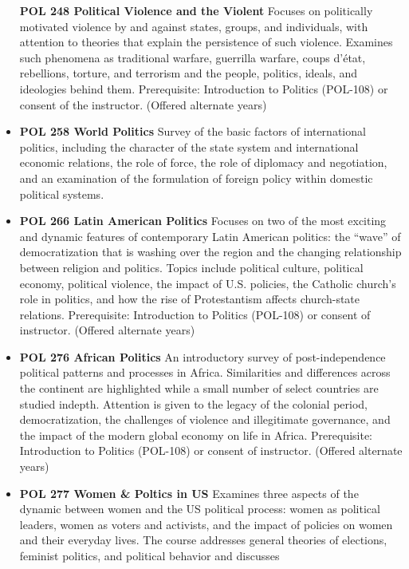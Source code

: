 \documentclass[
  letterpaper,
]{scrbook}
\begin{document}
\begin{itemize}
  \textbf{POL 248 Political Violence and the Violent} Focuses on
  politically motivated violence by and against states, groups, and
  individuals, with attention to theories that explain the persistence
  of such violence. Examines such phenomena as traditional warfare,
  guerrilla warfare, coups d'état, rebellions, torture, and terrorism
  and the people, politics, ideals, and ideologies behind them.
  Prerequisite: Introduction to Politics (POL-108) or consent of the
  instructor. (Offered alternate years)\\
\item
  \textbf{POL 258 World Politics} Survey of the basic factors of
  international politics, including the character of the state system
  and international economic relations, the role of force, the role of
  diplomacy and negotiation, and an examination of the formulation of
  foreign policy within domestic political systems.\\
\item
  \textbf{POL 266 Latin American Politics} Focuses on two of the most
  exciting and dynamic features of contemporary Latin American politics:
  the ``wave'' of democratization that is washing over the region and
  the changing relationship between religion and politics. Topics
  include political culture, political economy, political violence, the
  impact of U.S. policies, the Catholic church's role in politics, and
  how the rise of Protestantism affects church-state relations.
  Prerequisite: Introduction to Politics (POL-108) or consent of
  instructor. (Offered alternate years)
\item
  \textbf{POL 276 African Politics} An introductory survey of
  post-independence political patterns and processes in Africa.
  Similarities and differences across the continent are highlighted
  while a small number of select countries are studied indepth.
  Attention is given to the legacy of the colonial period,
  democratization, the challenges of violence and illegitimate
  governance, and the impact of the modern global economy on life in
  Africa. Prerequisite: Introduction to Politics (POL-108) or consent of
  instructor. (Offered alternate years)\\
\item
  \textbf{POL 277 Women \& Poltics in US} Examines three aspects of the
  dynamic between women and the US political process: women as political
  leaders, women as voters and activists, and the impact of policies on
  women and their everyday lives. The course addresses general theories
  of elections, feminist politics, and political behavior and discusses

\end{itemize}
\end{document}
